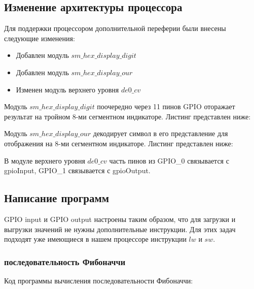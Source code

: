 \documentclass[a4paper,14pt]{article}
\begin{document}
	\subsection{Изменение архитектуры процессора}
	
	Для поддержки процессором дополнительной переферии были внесены следующие изменения:
	
	\begin{itemize}
		
		\item Добавлен модуль $sm\_hex\_display\_digit$

		\item Добавлен модуль $sm\_hex\_display\_our$
		
		\item Изменен модуль верхнего уровня $de0\_cv$	
			
	\end{itemize}
		
		Модуль $sm\_hex\_display\_digit$ поочередно через 11 пинов GPIO оторажает результат на тройном 8-ми сегментном индикаторе.
		Листинг представлен ниже: 
		
		{\small {}}
		
		Модуль $sm\_hex\_display\_our$ декодирует символ в его представление для отображения на 8-ми сегментном индикаторе.
		Листинг представлен ниже:
		
		{\small {}}
		
		В модуле верхнего уровня $de0\_cv$ часть пинов из GPIO\_0 связывается с gpioInput, GPIO\_1 связывается с gpioOutput.
			
		{\small {}}
	
	\subsection{Написание программ}
	
		GPIO input и GPIO output настроены таким образом, что для загрузки и выгрузки значений не нужны дополнительные инструкции.
		Для этих задач подходят уже имеющиеся в нашем процессоре инструкции $lw$ и $sw$.
		
	\subsubsection{последовательность Фибоначчи}
		
		Код программы вычисления последовательности Фибоначчи:
		
\end{document}
